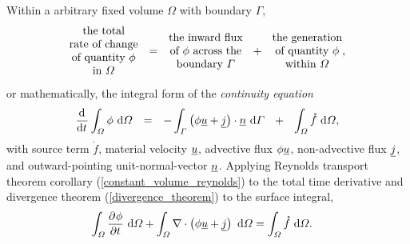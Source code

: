 Within a arbitrary fixed volume $\Omega$ with boundary $\Gamma$, 
\begin{align*}
  \begin{matrix}
    \text{the total} \\
    \text{rate of change} \\
    \text{of quantity $\phi$} \\
    \text{in $\Omega$}
  \end{matrix} \hspace{2.5mm} = \hspace{2.5mm} 
  \begin{matrix}
    \text{the inward flux} \\
    \text{of $\phi$ across the} \\
    \text{boundary $\Gamma$} \\
  \end{matrix} \hspace{2.5mm} + \hspace{2.5mm} 
  \begin{matrix}
    \text{the generation} \\
    \text{of quantity $\phi$} \\
    \text{within $\Omega$}
  \end{matrix}, 
\end{align*}
or mathematically, the integral form of the \emph{continuity equation}
\begin{align}
  \label{integral_continuity_equation}
  \totder{}{t} \int_{\Omega} \phi \d{\Omega} \hspace{2.5mm} = \hspace{2.5mm} - \int_{\Gamma} \left( \phi \rankone{u} + \rankone{j} \right) \cdot \rankone{n} \d{\Gamma} \hspace{2.5mm} + \hspace{2.5mm} \int_{\Omega} \mathring{f} \d{\Omega},
\end{align}
with source term $\mathring{f}$, material velocity $\rankone{u}$, advective flux $\phi \rankone{u}$, non-advective flux $\rankone{j}$, and outward-pointing unit-normal-vector $\rankone{n}$.  Applying Reynolds transport theorem corollary (\ref{constant_volume_reynolds}) to the total time derivative and divergence theorem (\ref{divergence_theorem})  to the surface integral,
\begin{align*}
  \int_{\Omega} \parder{\phi}{t} \d{\Omega} + \int_{\Omega} \nabla \cdot \left( \phi \rankone{u} + \rankone{j} \right) \d{\Omega} &= \int_{\Omega} \mathring{f} \d{\Omega}.
\end{align*}

